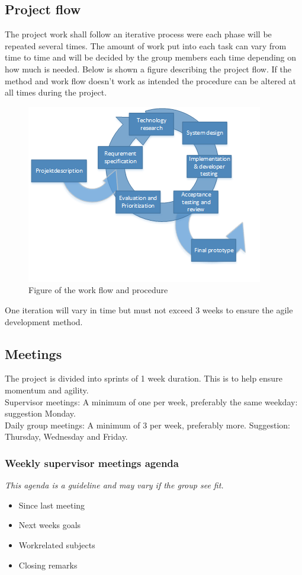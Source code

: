 \subsection{Project flow}
The project work shall follow an iterative process were each phase will be repeated several times. The amount of work put into each task can vary from time to time and will be decided by the group members each time depending on how much is needed. Below is shown a figure describing the project flow. If the method and work flow doesn't work as intended the procedure can be altered at all times during the project.
\begin{figure}[H]
\centering
\includegraphics[width=.7\textwidth]{billeder/iteration_fig.png}
\caption{Figure of the work flow and procedure}
\end{figure}
One iteration will vary in time but must not exceed 3 weeks to ensure the agile development method.\\

\subsection{Meetings}
The project is divided into sprints of 1 week duration. This is to help ensure momentum and agility.\\
Supervisor meetings: A minimum of one per week, preferably the same weekday: suggestion Monday.\\
Daily group meetings: A minimum of 3 per week, preferably more. Suggestion: Thursday, Wednesday and Friday.

\subsubsection{Weekly supervisor meetings agenda}
\textit{This agenda is a guideline and may vary if the group see fit.}
\begin{itemize}
\item Since last meeting
\item Next weeks goals
\item Workrelated subjects
\item Closing remarks
\end{itemize}

